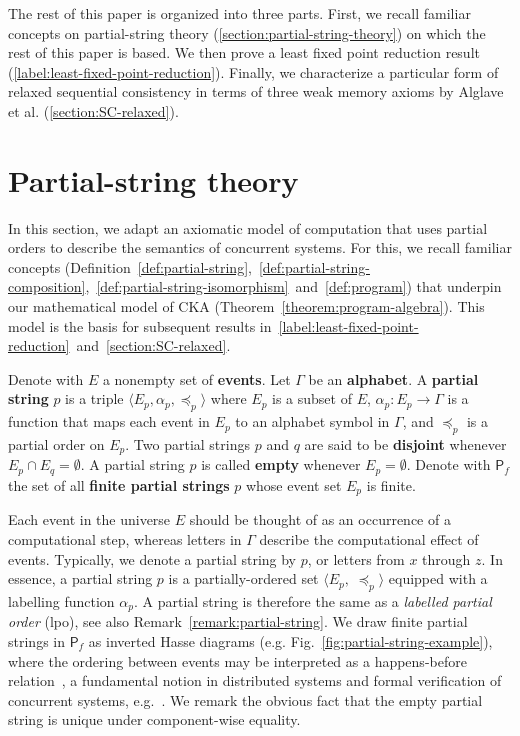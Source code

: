\documentclass{llncs}
\newcommand{\pair}[2]{\mbox{$\langle #1,\; #2 \rangle$}}
\newcommand{\tuple}[1]{\mbox{$\langle #1 \rangle$}}
\newcommand{\sP}{\mathsf{P}}
\newcommand{\defn}[1]{\textbf{#1}}
\begin{document}
The rest of this paper is organized into three parts. First, we recall familiar concepts on partial-string theory (\autoref{section:partial-string-theory}) on which the rest of this paper is based. We then prove a least fixed point reduction result (\autoref{label:least-fixed-point-reduction}). Finally, we characterize a particular form of relaxed sequential consistency in terms of three weak memory axioms by Alglave et al. (\autoref{section:SC-relaxed}).

\section{Partial-string theory}
\vspace{-0.3em}
\label{section:partial-string-theory}

In this section, we adapt an axiomatic model of computation that uses partial orders to describe the semantics of concurrent systems. For this, we recall familiar concepts (Definition~\ref{def:partial-string},~\ref{def:partial-string-composition},~\ref{def:partial-string-isomorphism}~and~\ref{def:program}) that underpin our mathematical model of CKA (Theorem~\ref{theorem:program-algebra}). This model is the basis for subsequent results in~\autoref{label:least-fixed-point-reduction}~and~\autoref{section:SC-relaxed}.

\begin{definition}
\label{def:partial-string}
Denote with $E$ a nonempty set of \defn{events}. Let $\Gamma$ be an \defn{alphabet}. A \defn{partial string} $p$ is a triple $\tuple{E_p, \alpha_p, \preceq_p}$ where $E_p$ is a subset of $E$, $\alpha_p \colon E_p \to \Gamma$ is a function that maps each event in $E_p$ to an alphabet symbol in $\Gamma$, and $\preceq_p$ is a partial order on $E_p$. Two partial strings $p$ and $q$ are said to be \defn{disjoint} whenever $E_p \cap E_q = \emptyset$. A partial string $p$ is called \defn{empty} whenever $E_p = \emptyset$. Denote with $\sP_f$ the set of all \defn{finite partial strings} $p$ whose event set $E_p$ is finite.
\end{definition}

Each event in the universe $E$ should be thought of as an occurrence of a computational step, whereas letters in $\Gamma$ describe the computational effect of events. Typically, we denote a partial string by $p$, or letters from $x$ through $z$. In essence, a partial string $p$ is a partially-ordered set $\pair{E_p}{\preceq_p}$ equipped with a labelling function $\alpha_p$. A partial string is therefore the same as a \emph{labelled partial order} (lpo), see also Remark~\ref{remark:partial-string}. We draw finite partial strings in $\sP_f$ as inverted Hasse diagrams (e.g. Fig.~\ref{fig:partial-string-example}), where the ordering between events may be interpreted as a happens-before relation~\cite{L1978}, a fundamental notion in distributed systems and formal verification of concurrent systems, e.g.~\cite{BOSSW2011,AMSS2012}. We remark the obvious fact that the empty partial string is unique under component-wise equality.
\end{document}
